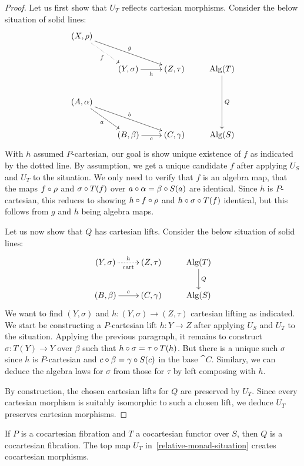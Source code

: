 \documentclass[reqno,10pt,a4paper,oneside]{amsart}
\begin{document}
\begin{proof}
Let us first show that $U_T$ reflects cartesian morphisms.
Consider the below situation of solid lines:
\[
\xymatrix{
  (X, \rho)
  \ar@{.>}[dr]_{f}
  \ar[drr]^{g}
\\&
  (Y, \sigma)
  \ar[r]_{h}
&
  (Z, \tau)
&
  \Alg(T)
  \ar[dd]^{Q}
\\
  (A, \alpha)
  \ar[dr]_{a}
  \ar[drr]^{b}
\\&
  (B, \beta)
  \ar[r]_{c}
&
  (C, \gamma)
&
  \Alg(S)
}
\]
With $h$ assumed $P$-cartesian, our goal is show unique existence of $f$ as indicated by the dotted line.
By assumption, we get a unique candidate $f$ after applying $U_S$ and $U_T$ to the situation.
We only need to verify that $f$ is an algebra map, \ie that the maps $f \mathbin{\circ} \rho$ and $\sigma \mathbin{\circ} T(f)$ over $a \mathbin{\circ} \alpha = \beta \mathbin{\circ} S(a)$ are identical.
Since $h$ is $P$-cartesian, this reduces to showing $h \mathbin{\circ} f \mathbin{\circ} \rho$ and $h \mathbin{\circ} \sigma \mathbin{\circ} T(f)$ identical, but this follows from $g$ and $h$ being algebra maps.

Let us now show that $Q$ has cartesian lifts.
Consider the below situation of solid lines:
\[
\xymatrix{
  (Y, \sigma)
  \ar@{.>}[r]_{\text{cart}}^{h}
&
  (Z, \tau)
&
  \Alg(T)
  \ar[d]^{Q}
\\
  (B, \beta)
  \ar[r]^{c}
&
  (C, \gamma)
&
  \Alg(S)
}
\]
We want to find $(Y, \sigma)$ and $h : (Y, \sigma) \to (Z, \tau)$ cartesian lifting as indicated.
We start be constructing a $P$-cartesian lift $h : Y \to Z$ after applying $U_S$ and $U_T$ to the situation.
Applying the previous paragraph, it remains to construct $\sigma : T(Y) \to Y$ over $\beta$ such that $h \mathbin{\circ} \sigma = \tau \mathbin{\circ} T(h)$.
But there is a unique such $\sigma$ since $h$ is $P$-cartesian and $c \mathbin{\circ} \beta = \gamma \mathbin{\circ} S(c)$ in the base $\cat{C}$.
Similary, we can deduce the algebra laws for $\sigma$ from those for $\tau$ by left composing with $h$.

By construction, the chosen cartesian lifts for $Q$ are preserved by $U_T$.
Since every cartesian morphism is suitably isomorphic to such a chosen lift, we deduce $U_T$ preserves cartesian morphisms.
\end{proof}

\begin{lemma}
\label{Alg-preserves-cocartesian-fib}
If $P$ is a cocartesian fibration and $T$ a cocartesian functor over $S$, then $Q$ is a cocartesian fibration.
The top map $U_T$ in~\eqref{relative-monad-situation} creates cocartesian morphisms.
\end{lemma}
\end{document}
